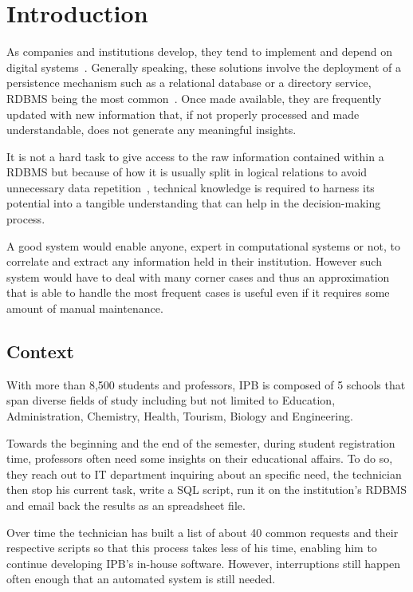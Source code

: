 \chapter{Introduction}\label{chapter:intro}
As companies and institutions develop, they tend to implement and depend on digital systems~\cite{ibm}. Generally speaking, these solutions involve the deployment of a persistence mechanism such as a relational database or a directory service, \gls{RDBMS} being the most common~\cite{apachedp}. Once  made available, they are frequently updated with new information that, if not properly processed and made understandable, does not generate any meaningful insights.

It is not a hard task to give access to the raw information contained within a \gls{RDBMS} but because of how it is usually split in logical relations to avoid unnecessary data repetition~\cite[Part~$\mathrm{V}$]{vaquinha}, technical knowledge is required to harness its potential into a tangible understanding that can help in the decision-making process. 

A good system would enable anyone, expert in computational systems or not, to correlate and extract any information held in their institution. However such system would have to deal with many corner cases and thus an approximation that is able to handle the most frequent cases is useful even if it requires some amount of manual maintenance.

\section{Context}\label{context}
With more than 8,500 students and professors, \gls{IPB} is composed of 5 schools that span diverse fields of study including but not limited to Education, Administration, Chemistry, Health, Tourism, Biology and Engineering.

Towards the beginning and the end of the semester, during student registration time, professors often need some insights on their educational affairs. To do so, they reach out to \gls{IT} department inquiring about an specific need, the technician then stop his current task, write a \gls{SQL} script, run it on the institution's \gls{RDBMS} and email back the results as an spreadsheet file.

Over time the technician has built a list of about 40 common requests and their respective scripts so that this process takes less of his time, enabling him to continue developing \gls{IPB}'s in-house software. However, interruptions still happen often enough that an automated system is still needed.

